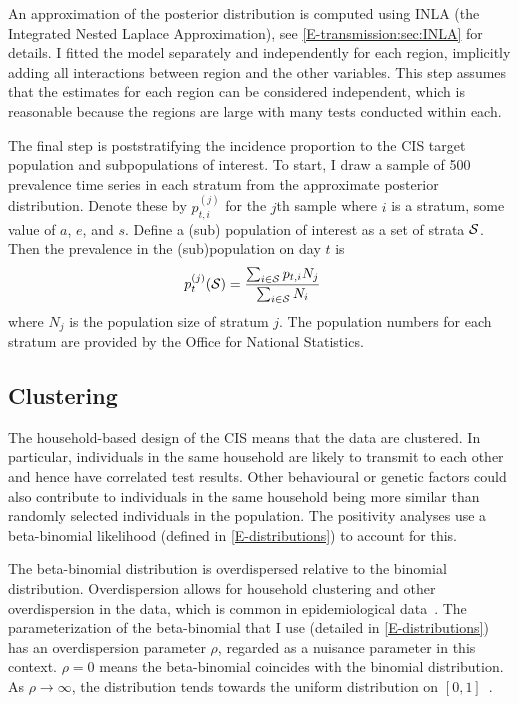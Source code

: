 \documentclass[thesis.tex]{subfiles}
\begin{document}
An approximation of the posterior distribution is computed using INLA (the Integrated Nested Laplace Approximation), see \cref{E-transmission:sec:INLA} for details.
I fitted the model separately and independently for each region, implicitly adding all interactions between region and the other variables.
This step assumes that the estimates for each region can be considered independent, which is reasonable because the regions are large with many tests conducted within each.

The final step is poststratifying the incidence proportion to the CIS target population and subpopulations of interest.
To start, I draw a sample of 500 prevalence time series in each stratum from the approximate posterior distribution.
Denote these by $p^(j)_{t,i}$ for the $j$th sample where $i$ is a stratum, \ie some value of $a$, $e$, and $s$.
Define a (sub) population of interest as a set of strata $\mathcal{S}$.
Then the prevalence in the (sub)population on day $t$ is
\begin{align}
p^{(j)}_t(\mathcal{S})
&= \frac{\sum_{i \in \mathcal{S}} p_{t,i} N_j}{\sum_{i \in \mathcal{S}} N_i}
\end{align}
where $N_j$ is the population size of stratum $j$.
The population numbers for each stratum are provided by the Office for National Statistics.

\subsection{Clustering} \label{biology-data:sec:clustering}

The household-based design of the CIS means that the data are clustered.
In particular, individuals in the same household are likely to transmit to each other and hence have correlated test results.
Other behavioural or genetic factors could also contribute to individuals in the same household being more similar than randomly selected individuals in the population.
The positivity analyses use a beta-binomial likelihood (defined in \cref{E-distributions}) to account for this.

The beta-binomial distribution is overdispersed relative to the binomial distribution.
Overdispersion allows for household clustering and other overdispersion in the data, which is common in epidemiological data~\autocite{griffithsBBD}.
The parameterization of the beta-binomial that I use (detailed in \cref{E-distributions}) has an overdispersion parameter $\rho$, regarded as a nuisance parameter in this context.
$\rho=0$ means the beta-binomial coincides with the binomial distribution.
As $\rho \to \infty$, the distribution tends towards the uniform distribution on $[0, 1]$~\autocite{hughesUsing}.
\end{document}
